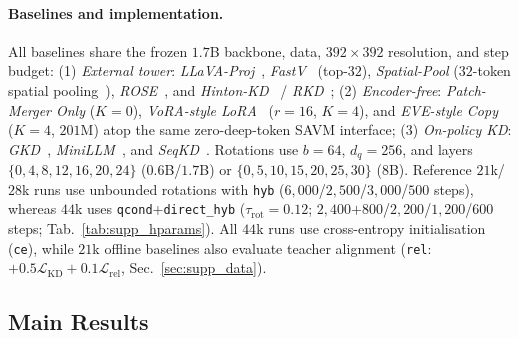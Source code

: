 \paragraph{Baselines and implementation.}
All baselines share the frozen $1.7$B backbone, data, $392{\times}392$
resolution, and step budget:
(1) \emph{External tower}: \emph{LLaVA-Proj}~\citep{liu2024improved},
\emph{FastV}~\citep{chen2024fastv} (top-$32$), \emph{Spatial-Pool}
($32$-token spatial pooling~\citep{cha2024honeybee}),
\emph{ROSE}~\citep{rose2025}, and \emph{Hinton-KD}~\citep{hinton2015distilling} /
\emph{RKD}~\citep{park2019rkd};
(2) \emph{Encoder-free}: \emph{Patch-Merger Only} ($K{=}0$),
\emph{VoRA-style LoRA}~\citep{vora2025} ($r{=}16$, $K{=}4$), and
\emph{EVE-style Copy}~\citep{diao2024eve} ($K{=}4$, $201$M) atop the same
zero-deep-token SAVM interface;
(3) \emph{On-policy KD}: \emph{GKD}~\citep{agarwal2024gkd},
\emph{MiniLLM}~\citep{gu2024minillm}, and \emph{SeqKD}~\citep{kim2016sequence}.
Rotations use $b{=}64$, $d_q{=}256$, and layers $\{0,4,8,12,16,20,24\}$
($0.6$B/$1.7$B) or $\{0,5,10,15,20,25,30\}$ ($8$B). Reference $21$k/$28$k runs
use unbounded rotations with \texttt{hyb} ($6{,}000$/$2{,}500$/$3{,}000$/$500$
steps), whereas $44$k uses \texttt{qcond}+\texttt{direct\_hyb}
($\tau_{\mathrm{rot}}{=}0.12$; $2{,}400{+800}$/$2{,}200$/$1{,}200$/$600$ steps;
Tab.~\ref{tab:supp_hparams}). All $44$k runs use cross-entropy initialisation
(\texttt{ce}), while $21$k offline baselines also evaluate teacher alignment
(\texttt{rel}: $+0.5\mathcal{L}_{\mathrm{KD}}{+}0.1\mathcal{L}_{\mathrm{rel}}$,
Sec.~\ref{sec:supp_data}).

\subsection{Main Results}
\label{sec:main}


